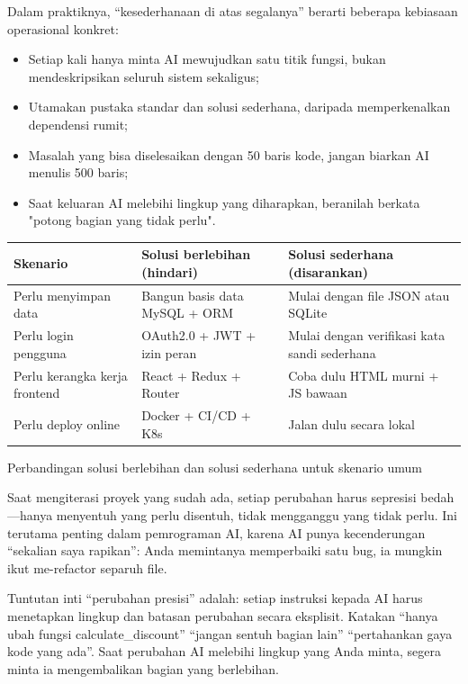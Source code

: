 Dalam praktiknya, “kesederhanaan di atas segalanya” berarti beberapa kebiasaan operasional konkret:

\begin{itemize}
  \item Setiap kali hanya minta AI mewujudkan satu titik fungsi, bukan mendeskripsikan seluruh sistem sekaligus;
  \item Utamakan pustaka standar dan solusi sederhana, daripada memperkenalkan dependensi rumit;
  \item Masalah yang bisa diselesaikan dengan 50 baris kode, jangan biarkan AI menulis 500 baris;
  \item Saat keluaran AI melebihi lingkup yang diharapkan, beranilah berkata "potong bagian yang tidak perlu".
\end{itemize}

\begin{center}
\begin{tabularx}{\linewidth}{|X|X|X|}
\hline
\textbf{Skenario} & \textbf{Solusi berlebihan (hindari)} & \textbf{Solusi sederhana (disarankan)} \tabularnewline
\hline
Perlu menyimpan data & Bangun basis data MySQL + ORM & Mulai dengan file JSON atau SQLite \tabularnewline
Perlu login pengguna & OAuth2.0 + JWT + izin peran & Mulai dengan verifikasi kata sandi sederhana \tabularnewline
Perlu kerangka kerja frontend & React + Redux + Router & Coba dulu HTML murni + JS bawaan \tabularnewline
Perlu deploy online & Docker + CI/CD + K8s & Jalan dulu secara lokal \tabularnewline
\hline
\end{tabularx}
\end{center}

\begin{center}\small\color{gray}Perbandingan solusi berlebihan dan solusi sederhana untuk skenario umum\end{center}


Saat mengiterasi proyek yang sudah ada, setiap perubahan harus sepresisi bedah—hanya menyentuh yang perlu disentuh, tidak mengganggu yang tidak perlu. Ini terutama penting dalam pemrograman AI, karena AI punya kecenderungan “sekalian saya rapikan”: Anda memintanya memperbaiki satu bug, ia mungkin ikut me-refactor separuh file.

Tuntutan inti “perubahan presisi” adalah: setiap instruksi kepada AI harus menetapkan lingkup dan batasan perubahan secara eksplisit. Katakan “hanya ubah fungsi calculate\_discount” “jangan sentuh bagian lain” “pertahankan gaya kode yang ada”. Saat perubahan AI melebihi lingkup yang Anda minta, segera minta ia mengembalikan bagian yang berlebihan.

